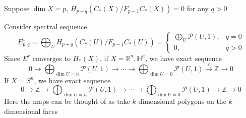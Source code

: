 \documentclass[../main.tex]{subfiles}
\begin{document}
\begin{lemma}
Suppose $\dim X=p$, $H_{p+q}(C_*(X)/F_{p-1}C_*(X))=0$ for any $q>0$
\end{lemma}

\begin{theorem}
Consider spectral sequence
\[E^1_{p,q}=\displaystyle \bigoplus_{U}H_{p+q}(C_*(U)/F_{p-1}C_*(U))=\begin{cases}
\displaystyle \bigoplus_{U}\mathcal{P}(U,1), &q=0 \\
0, & q>0
\end{cases}\]
Since $E^r$ converges to $H_*(X)$, if $X=\mathbb R^n,\mathbb H^n$, we have exact sequence
\[\displaystyle0\to\bigoplus_{\dim U=n}\mathcal{P}(U,1)\to\cdots\to\bigoplus_{\dim U=0}\mathcal{P}(U,1)\xrightarrow{\varepsilon}\mathbb Z\to0\]
If $X=S^n$, we have exact sequence
\[\displaystyle0\to\mathbb Z\to\bigoplus_{\dim U=n}\mathcal{P}(U,1)\to\cdots\to\bigoplus_{\dim U=0}\mathcal{P}(U,1)\to\mathbb Z\to0\]
Here the maps can be thought of as take $k$ dimensional polygons on the $k$ dimensional faces
\end{theorem}
\end{document}

